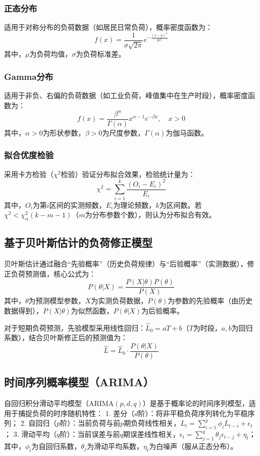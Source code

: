 \documentclass[12pt,a4paper]{article}
\begin{document}
\subsubsection{正态分布}
适用于对称分布的负荷数据（如居民日常负荷），概率密度函数为：
\[
f(x) = \frac{1}{\sigma\sqrt{2\pi}}e^{-\frac{(x-\mu)^2}{2\sigma^2}}
\]
其中，$\mu$为负荷均值，$\sigma$为负荷标准差。

\subsubsection{Gamma分布}
适用于非负、右偏的负荷数据（如工业负荷，峰值集中在生产时段），概率密度函数为：
\[
f(x) = \frac{\beta^\alpha}{\Gamma(\alpha)}x^{\alpha-1}e^{-\beta x}, \quad x>0
\]
其中，$\alpha>0$为形状参数，$\beta>0$为尺度参数，$\Gamma(\alpha)$为伽马函数。

\subsubsection{拟合优度检验}
采用卡方检验（$\chi^2$检验）验证分布拟合效果，检验统计量为：
\[
\chi^2 = \sum_{i=1}^k \frac{(O_i - E_i)^2}{E_i}
\]
其中，$O_i$为第$i$区间的实测频数，$E_i$为理论频数，$k$为区间数。若$\chi^2 < \chi^2_{\alpha}(k-m-1)$（$m$为分布参数个数），则认为分布拟合有效。

\subsection{基于贝叶斯估计的负荷修正模型}
贝叶斯估计通过融合“先验概率”（历史负荷规律）与“后验概率”（实测数据），修正负荷预测值，核心公式为：
\[
P(\theta|X) = \frac{P(X|\theta)P(\theta)}{P(X)}
\]
其中，$\theta$为预测模型参数，$X$为实测负荷数据，$P(\theta)$为参数的先验概率（由历史数据得到），$P(X|\theta)$为似然函数，$P(\theta|X)$为后验概率。

对于短期负荷预测，先验模型采用线性回归：$\hat{L}_0 = aT + b$（$T$为时段，$a,b$为回归系数），结合贝叶斯修正后的预测值为：
\[
\hat{L} = \hat{L}_0 \cdot \frac{P(\theta|X)}{P(\theta)}
\]

\subsection{时间序列概率模型（ARIMA）}
自回归积分滑动平均模型（ARIMA$(p,d,q)$）是基于概率论的时间序列模型，适用于捕捉负荷的时序随机特性：
1. 差分（$d$阶）：将非平稳负荷序列转化为平稳序列；
2. 自回归（$p$阶）：当前负荷与前$p$期负荷线性相关，$L_t = \sum_{i=1}^p \phi_i L_{t-i} + \epsilon_t$；
3. 滑动平均（$q$阶）：当前误差与前$q$期误差线性相关，$\epsilon_t = \sum_{j=1}^q \theta_j \epsilon_{t-j} + \eta_t$；
其中，$\phi_i$为自回归系数，$\theta_j$为滑动平均系数，$\eta_t$为白噪声（服从正态分布）。
\end{document}
